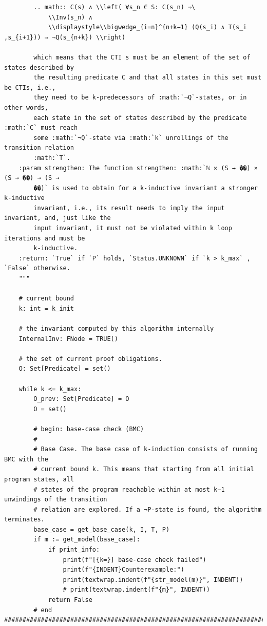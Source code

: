 \documentclass[11pt,a4paper]{report}%
\newenvironment{code}{\captionsetup{type=listing}}{}
\begin{document}
\begin{code}
\begin{verbatim}
        .. math:: C(s) ∧ \\left( ∀s_n ∈ S: C(s_n) ⇒\
            \\Inv(s_n) ∧
            \\displaystyle\\bigwedge_{i=n}^{n+k−1} (Q(s_i) ∧ T(s_i ,s_{i+1})) ⇒ ¬Q(s_{n+k}) \\right)

        which means that the CTI s must be an element of the set of states described by
        the resulting predicate C and that all states in this set must be CTIs, i.e.,
        they need to be k-predecessors of :math:`¬Q`-states, or in other words,
        each state in the set of states described by the predicate :math:`C` must reach
        some :math:`¬Q`-state via :math:`k` unrollings of the transition relation
        :math:`T`.
    :param strengthen: The function strengthen: :math:`ℕ × (S → ��) × (S → ��) → (S →
        ��)` is used to obtain for a k-inductive invariant a stronger k-inductive
        invariant, i.e., its result needs to imply the input invariant, and, just like the
        input invariant, it must not be violated within k loop iterations and must be
        k-inductive.
    :return: `True` if `P` holds, `Status.UNKNOWN` if `k > k_max` , `False` otherwise.
    """

    # current bound
    k: int = k_init

    # the invariant computed by this algorithm internally
    InternalInv: FNode = TRUE()

    # the set of current proof obligations.
    O: Set[Predicate] = set()

    while k <= k_max:
        O_prev: Set[Predicate] = O
        O = set()

        # begin: base-case check (BMC)
        #
        # Base Case. The base case of k-induction consists of running BMC with the
        # current bound k. This means that starting from all initial program states, all
        # states of the program reachable within at most k−1 unwindings of the transition
        # relation are explored. If a ¬P-state is found, the algorithm terminates.
        base_case = get_base_case(k, I, T, P)
        if m := get_model(base_case):
            if print_info:
                print(f"[{k=}] base-case check failed")
                print(f"{INDENT}Counterexample:")
                print(textwrap.indent(f"{str_model(m)}", INDENT))
                # print(textwrap.indent(f"{m}", INDENT))
            return False
        # end ############################################################################


\end{verbatim}
\end{code}
\end{document}
